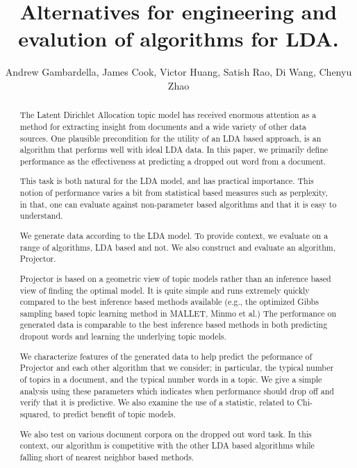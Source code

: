 \documentclass{article}
\title{Alternatives for engineering and evalution of algorithms for LDA.}
\author{Andrew Gambardella, James Cook, Victor Huang, Satish Rao, Di Wang, Chenyu Zhao}
\date{}
\begin{document}
\maketitle

\begin{abstract}

The Latent Dirichlet Allocation topic model has received enormous
attention as a method for extracting insight from documents and a wide
variety of other data sources.  One plausible precondition for the
utility of an LDA based approach, is an algorithm that performs well
with ideal LDA data.  In this paper, we primarily define performance
as the effectiveness at predicting a dropped out word from a
document. 

This task is both natural for the LDA model, and has
practical importance. This notion of performance varies a bit
from statistical based measures such as perplexity, in that,
one can evaluate against non-parameter based algorithms and
that it is easy to understand. 

We generate data according to the LDA model. To provide context, we
evaluate on a range of algorithms, LDA based and not. We also
construct and evaluate an algorithm, Projector.

Projector is based on a geometric view of topic models rather than an
inference based view of finding the optimal model.  It is quite simple
and runs extremely quickly compared to the best inference based
methods available (e.g., the optimized Gibbs sampling based topic
learning method in MALLET, Minmo et al.)  The performance on generated
data is comparable to the best inference based methods in both
predicting dropout words and learning the underlying topic models.

We characterize features of the generated data to help predict the
peformance of Projector and each other algorithm that we consider; in
particular, the typical number of topics in a document, and the typical
number words in a topic.  We give a simple analysis using these
parameters which indicates when performance should drop off and verify
that it is predictive.  We also examine the use of a statistic,
related to Chi-squared, to predict benefit of topic models.

We also test on various document corpora on the dropped out 
word task. In this context, our algorithm is competitive with the other
LDA based algorithms while falling short of nearest neighbor
based methods.


\end{abstract}
\end{document}
